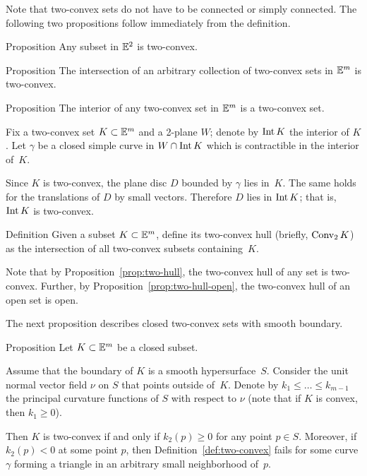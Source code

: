 Note that two-convex sets do not have to be connected or simply connected. 
The following two propositions follow immediately from the definition.

\begin{thm}{Proposition}
Any subset in $\mathbb{E}^2$ is two-convex.
\end{thm}


\begin{thm}{Proposition}\label{prop:two-hull}
The intersection of an arbitrary collection of two-convex sets in $\mathbb{E}^m$ is two-convex.
\end{thm}

\begin{thm}{Proposition}\label{prop:two-hull-open}
The interior of any two-convex set in $\mathbb{E}^m$ is a two-convex set.
\end{thm}

Fix a  two-convex set $K\subset \EE^m$ and a 2-plane $W$;
denote by \index{$\Int$}$\mathop{\rm Int}\nolimits K$ the interior of $K$.
Let $\gamma$ be a closed simple curve in $W\cap \Int K$ 
which is contractible in the interior of~$K$.

Since $K$ is two-convex,
the plane disc $D$ bounded by $\gamma$ lies in~$K$.
The same holds for the translations of $D$ by small vectors.
Therefore $D$ lies in $\mathop{\rm Int}\nolimits K$;
that is, $\mathop{\rm Int}\nolimits K$ is two-convex.
\qeds

\begin{thm}{Definition}
Given a subset $K\subset \EE^m$, define its two-convex hull (briefly, $\mathop{\rm Conv}\nolimits_2K$) as the intersection of all two-convex subsets containing~$K$.
\end{thm}

Note that by Proposition~\ref{prop:two-hull},
the two-convex hull of any set is two-convex.
Further, 
by Proposition~\ref{prop:two-hull-open}, the
two-convex hull of an open set is open.

The next proposition describes  closed two-convex sets with smooth boundary.

\begin{thm}{Proposition}\label{prop:two-cove+smooth}
Let $K\subset \EE^m$ be a closed subset.

Assume that the boundary of $K$ is a smooth hypersurface~$S$.
Consider the unit normal vector field $\nu$ on $S$ that  points outside of~$K$.
Denote by $k_1\le \dots\le k_{m-1}$ the principal curvature functions of $S$ with respect to $\nu$ (note that if $K$ is convex, then  $k_1\ge 0$).

Then $K$ is two-convex if and only if $k_2(p)\ge 0$ for any point $p\in S$.
Moreover, if $k_2(p)<0$ at some point $p$, then Definition~\ref{def:two-convex} fails for some curve $\gamma$ forming a triangle in an arbitrary small neighborhood of~$p$.
\end{thm}

